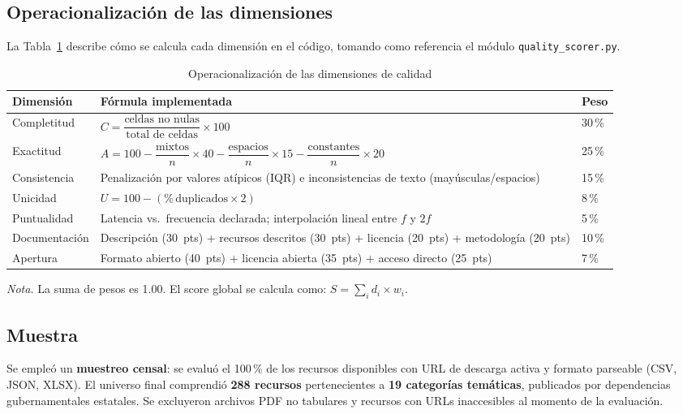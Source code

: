 \documentclass[12pt,letterpaper]{article}
\begin{document}
\subsection{Operacionalizaci\'on de las dimensiones}

La Tabla~\ref{tab:operacionalizacion} describe c\'omo se calcula cada dimensi\'on en el
c\'odigo, tomando como referencia el m\'odulo \texttt{quality\_scorer.py}.

\begin{table}[h!]
\centering
\caption{Operacionalizaci\'on de las dimensiones de calidad}
\label{tab:operacionalizacion}
\begin{tabular}{p{2.6cm}p{8cm}p{1.8cm}}
\toprule
\textbf{Dimensi\'on} & \textbf{F\'ormula implementada} & \textbf{Peso} \\
\midrule
Completitud &
  $C = \dfrac{\text{celdas no nulas}}{\text{total de celdas}} \times 100$ & 30\,\% \\[10pt]
Exactitud &
  $A = 100 - \dfrac{\text{mixtos}}{n}\times40 - \dfrac{\text{espacios}}{n}\times15
  - \dfrac{\text{constantes}}{n}\times20$ & 25\,\% \\[10pt]
Consistencia &
  Penalizaci\'on por valores at\'ipicos (IQR) e inconsistencias de texto (may\'usculas/espacios) & 15\,\% \\[6pt]
Unicidad &
  $U = 100 - (\%\,\text{duplicados} \times 2)$ & 8\,\% \\[6pt]
Puntualidad &
  Latencia vs.\ frecuencia declarada; interpolaci\'on lineal entre $f$ y $2f$ & 5\,\% \\[6pt]
Documentaci\'on &
  Descripci\'on (30~pts) + recursos descritos (30~pts) + licencia (20~pts) + metodolog\'ia (20~pts) & 10\,\% \\[6pt]
Apertura &
  Formato abierto (40~pts) + licencia abierta (35~pts) + acceso directo (25~pts) & 7\,\% \\
\bottomrule
\end{tabular}
\end{table}

\noindent\textit{Nota.} La suma de pesos es 1.00. El score global se calcula como:
$S = \sum_{i} d_i \times w_i$.

\subsection{Muestra}

Se emple\'o un \textbf{muestreo censal}: se evalu\'o el 100\,\% de los recursos
disponibles con URL de descarga activa y formato parseable (CSV, JSON, XLSX). El
universo final comprendi\'o \textbf{288 recursos} pertenecientes a \textbf{19
categor\'ias tem\'aticas}, publicados por dependencias gubernamentales estatales. Se
excluyeron archivos PDF no tabulares y recursos con URLs inaccesibles al momento
de la evaluaci\'on.
\end{document}
